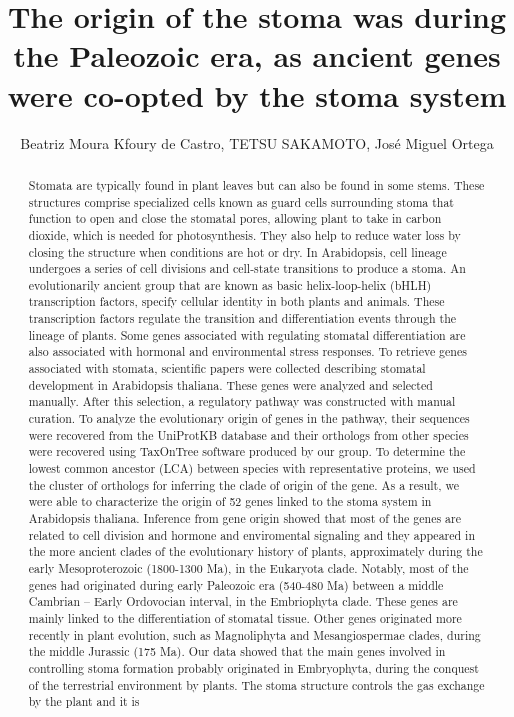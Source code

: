 \documentclass[twoside]{article}
\title{\vspace{-15mm}\fontsize{24pt}{10pt}\selectfont\textbf{ The origin of the stoma was during the Paleozoic era,  as ancient genes were co-opted by the stoma system }} %
\author{ Beatriz Moura Kfoury de Castro, TETSU SAKAMOTO, Jos\'e Miguel Ortega }
\affil{ Universidade Federal de Minas Gerais }
\date{}
\begin{document}
  
  
  \maketitle %
  
  
  \thispagestyle{fancy} %
  
  
  \begin{abstract}
  Stomata are typically found in plant leaves but can also be found in some stems. These structures comprise specialized cells known as guard cells surrounding stoma that function to open and close the stomatal pores,  allowing plant to take in carbon dioxide,  which is needed for photosynthesis. They also help to reduce water loss by closing the structure when conditions are hot or dry. In Arabidopsis,  cell lineage undergoes a series of cell divisions and cell-state transitions to produce a stoma. An evolutionarily ancient group that are known as basic helix-loop-helix (bHLH) transcription factors,  specify cellular identity in both plants and animals. These transcription factors regulate the transition and differentiation events through the lineage of plants. Some genes associated with regulating stomatal differentiation are also associated with hormonal and environmental stress responses. To retrieve genes associated with stomata,  scientific papers were collected describing stomatal development in Arabidopsis thaliana. These genes were analyzed and selected manually. After this selection,  a regulatory pathway was constructed with manual curation. To analyze the evolutionary origin of genes in the pathway,  their sequences were recovered from the UniProtKB database and their orthologs from other species were recovered using TaxOnTree software produced by our group. To determine the lowest common ancestor (LCA) between species with representative proteins,  we used the cluster of orthologs for inferring the clade of origin of the gene. As a result,  we were able to characterize the origin of 52 genes linked to the stoma system in Arabidopsis thaliana. Inference from gene origin showed that most of the genes are related to cell division and hormone and enviromental signaling and they appeared in the more ancient clades of the evolutionary history of plants,  approximately during the early Mesoproterozoic (1800-1300 Ma),  in the Eukaryota clade. Notably,  most of the genes had originated during early Paleozoic era (540-480 Ma) between a middle Cambrian – Early Ordovocian interval,  in the Embriophyta clade. These genes are mainly linked to the differentiation of stomatal tissue. Other genes originated more recently in plant evolution,  such as Magnoliphyta and Mesangiospermae clades,  during the middle Jurassic (175 Ma). Our data showed that the main genes involved in controlling stoma formation probably originated in Embryophyta,  during the conquest of the terrestrial environment by plants. The stoma structure controls the gas exchange by the plant and it is 
\end{abstract}
\end{document}
